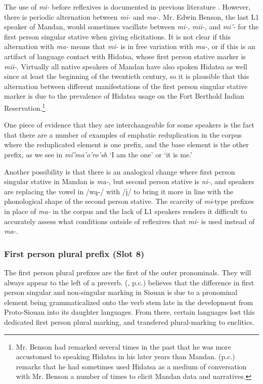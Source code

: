 The use of \textit{mi-} before reflexives is documented in previous literature \citep{kennard1936,hollow1970,mixco1997a}. However, there is periodic alternation between \textit{mi-} and \textit{ma-}. Mr. Edwin Benson, the last L1 speaker of Mandan, would sometimes vacillate between \textit{mi-}, \textit{mii-}, and \textit{mi'-} for the first person singular stative when giving elicitations. It is not clear if this alternation with \textit{ma-} means that \textit{mi-} is in free variation with \textit{ma-}, or if this is an artifact of language contact with Hidatsa, whose first person stative marker is \textit{mii-}. Virtually all native speakers of Mandan have also spoken Hidatsa as well since at least the beginning of the twentieth century, so it is plausible that this alternation between different manifestations of the first person singular stative marker is due to the prevalence of Hidatsa usage on the Fort Berthold Indian Reservation.\footnote{Mr. Benson had remarked several times in the past that he was more accustomed to speaking Hidatsa in his later years than Mandan. \citeauthor{park2012} (p.c.) remarks that he had sometimes used Hidatsa as a medium of conversation with Mr. Benson a number of times to elicit Mandan data and narratives.}

One piece of evidence that they are interchangeable for some speakers is the fact that there are a number of examples of emphatic reduplication in the corpus where the reduplicated element is one prefix, and the base element is the other prefix, as we see in \textit{mí'ma'o'ro'sh} `I am the one' or `it is me.' 

Another possibility is that there is an analogical change where first person singular stative in Mandan is \textit{ma-}, but second person stative is \textit{ni-}, and speakers are replacing the vowel in /wą-/ with /į/ to bring it more in line with the phonological shape of the second person stative. The scarcity of \textit{mi}-type prefixes in place of \textit{ma-} in the corpus and the lack of L1 speakers renders it difficult to accurately assess what conditions outside of reflexives that \textit{mi-} is used instead of \textit{ma-}. 

\subsubsection{First person plural prefix (Slot 8)}\label{SubsubFirstPersonPlural}

The first person plural prefixes are the first of the outer pronominals. They will always appear to the left of a preverb. \citeauthor{rankinetalnd} (\citeyear{rankinetalnd}, p.c.) believes that the difference in first person singular and non-singular marking in Siouan is due to a pronominal element being grammaticalized onto the verb stem late in the development from Proto-Siouan into its daughter languages. From there, certain languages lost this dedicated first person plural marking, and transfered plural-marking to enclitics. 

